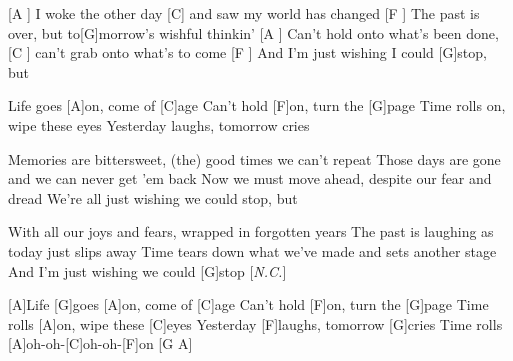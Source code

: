 

\begin{guitar}
	[A ] I woke the other day [C] and saw my world has changed
	[F ] The past is over, but to[G]morrow's wishful thinkin'
	[A ] Can't hold onto what's been done, [C ] can't grab onto what's to come
	[F ] And I'm just wishing I could [G]stop, but
	
	Life goes [A]on, come of [C]age
	Can't hold [F]on, turn the [G]page
	Time rolls on, wipe these eyes
	Yesterday laughs, tomorrow cries
	
	Memories are bittersweet, (the) good times we can't repeat
	Those days are gone and we can never get 'em back
	Now we must move ahead, despite our fear and dread
	We're all just wishing we could stop, but
	
	 

	With all our joys and fears, wrapped in forgotten years
	The past is laughing as today just slips away
	Time tears down what we've made and sets another stage
	And I'm just wishing we could [G]stop [\textit{N.C.}]{}
	
	[A]Life [G]goes [A]on, come of [C]age
	Can't hold [F]on, turn the [G]page
	Time rolls [A]on, wipe these [C]eyes
	Yesterday [F]laughs, tomorrow [G]cries
	Time rolls [A]oh-oh-[C]oh-oh-[F]on [G A]{}
\end{guitar}